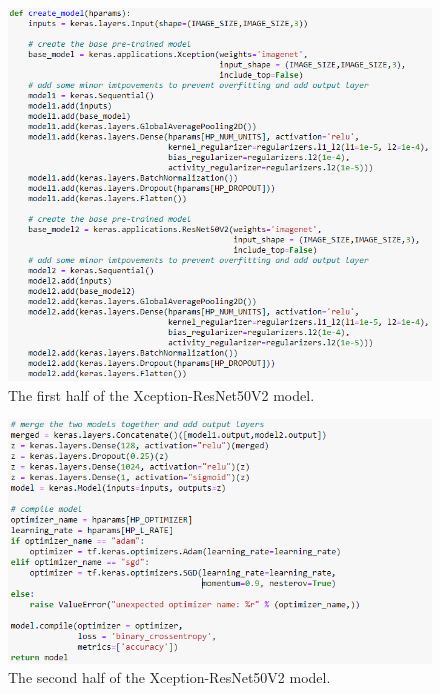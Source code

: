 \begin{figure}[H]
    \centering
    \includegraphics[width=\textwidth]{figures/xception-improvement-3-part1.png}
    \caption{The first half of the Xception-ResNet50V2 model.}
    \label{fig:xception-improvement-3-part1}
\end{figure}
\begin{figure}[H]
    \centering
    \includegraphics[width=\textwidth]{figures/xception-improvement-3-part2.png}
    \caption{The second half of the Xception-ResNet50V2 model.}
    \label{fig:xception-improvement-3-part2}
\end{figure}
